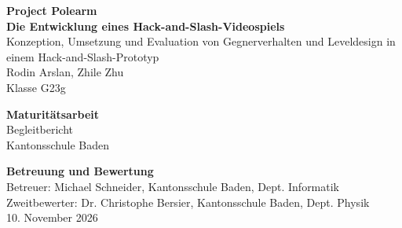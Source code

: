 \documentclass[10pt]{article}
\begin{document}

\begin{titlepage}
    \begin{center}
        \vspace*{2cm}

        \textbf{\Huge{Project Polearm}} \\ [2em]
        \textbf{\Large Die Entwicklung eines Hack-and-Slash-Videospiels} \\ [0.6em]
        \large{Konzeption, Umsetzung und Evaluation von Gegnerverhalten und Leveldesign in einem Hack-and-Slash-Prototyp} \\ [2em]

        \Large{Rodin Arslan, Zhile Zhu} \\ [0.5em]
        \large{Klasse G23g}

        \vspace{3cm}

        \LARGE{\textbf{Maturitätsarbeit}} \\ [0.3em]
        \Large{Begleitbericht} \\ [0.5em]
        \large{Kantonsschule Baden}

        \vfill

        \Large{\textbf{Betreuung und Bewertung}} \\ [0.5em]
        \large{Betreuer: Michael Schneider, Kantonsschule Baden, Dept. Informatik} \\
        \large{Zweitbewerter: Dr. Christophe Bersier, Kantonsschule Baden, Dept. Physik} \\

        \vspace{2cm}
        \large{10. November 2026}
    \end{center}
\end{titlepage}

\newpage

\end{document}
